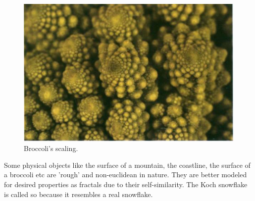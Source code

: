 \begin{figure}[h!]
    \includegraphics[width=\linewidth]{Pictures/broccoli_zoomed.png}
    \caption{Broccoli's scaling.}
    \label{fig:broccoli_zoomed}
\end{figure}
Some physical objects like the surface of a mountain, the coastline, the surface
of a broccoli etc are 'rough' and non-euclidean in nature. They are better
modeled for desired properties as fractals due to their self-similarity. The
Koch snowflake is called so because it resembles a real snowflake.
